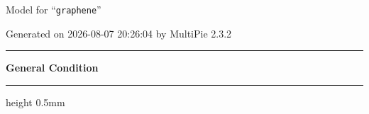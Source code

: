 \documentclass[fleqn,10pt,landscape]{jsarticle}
\begin{document}
\setcounter{MaxMatrixCols}{32}

\renewcommand{\tablename}{Table~}
\renewcommand{\figurename}{Figure~}
\setlength{\baselineskip}{16pt}
\setlength{\parindent}{0pt}
\setlength{\mathindent}{0pt}
\footnotesize
\begin{center}
\LARGE
Model for ``\texttt{graphene}''
\end{center}
\begin{flushright}
Generated on 2026-08-07 20:26:04 by MultiPie 2.3.2
\end{flushright}
\setlength{\baselineskip}{16pt}
\footnotesize
\vspace{5mm}
\noindent \rule[0.5mm]{5mm}{0.5mm}\hspace{3mm}\textbf{General Condition}\hspace{3mm}\leaders\hrule height 0.5mm\hfill\kern0pt
\vspace{3mm}
\end{document}
